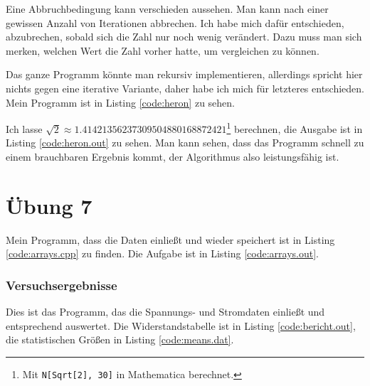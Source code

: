 Eine Abbruchbedingung kann verschieden aussehen. Man kann nach einer gewissen Anzahl von Iterationen abbrechen. Ich habe mich dafür entschieden, abzubrechen, sobald sich die Zahl nur noch wenig verändert. Dazu muss man sich merken, welchen Wert die Zahl vorher hatte, um vergleichen zu können.

Das ganze Programm könnte man rekursiv implementieren, allerdings spricht hier nichts gegen eine iterative Variante, daher habe ich mich für letzteres entschieden. Mein Programm ist in Listing \ref{code:heron} zu sehen.


Ich lasse $\sqrt{2} \approx 1.41421356237309504880168872421$\footnote{Mit \texttt{N[Sqrt[2], 30]} in Mathematica berechnet.} berechnen, die Ausgabe ist in Listing \ref{code:heron.out} zu sehen. Man kann sehen, dass das Programm schnell zu einem brauchbaren Ergebnis kommt, der Algorithmus also leistungsfähig ist.



\chapter{Übung 7}

Mein Programm, dass die Daten einließt und wieder speichert ist in Listing \ref{code:arrays.cpp} zu finden. Die Aufgabe ist in Listing \ref{code:arrays.out}.


\subsection{Versuchsergebnisse}

Dies ist das Programm, das die Spannungs- und Stromdaten einließt und entsprechend auswertet. Die Widerstandstabelle ist in Listing \ref{code:bericht.out}, die statistischen Größen in Listing \ref{code:means.dat}.





